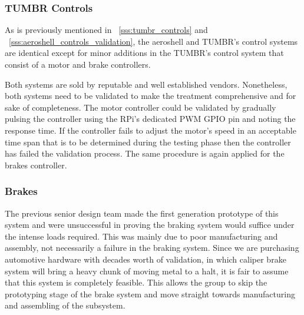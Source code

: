 \subsubsection{TUMBR Controls}

\indent\indent  As is previously mentioned in ~\ref{sss:tumbr_controls} and ~\ref{sss:aeroshell_controls_validation}, the aeroshell and TUMBR's control systems are identical except for minor additions in the TUMBR's control system that consist of a motor and brake controllers.

Both systems are sold by reputable and well established vendors. Nonetheless, both systems need to be validated to make the treatment comprehensive and for sake of completeness. The motor controller could be validated by gradually pulsing the controller using the RPi's dedicated PWM GPIO pin and noting the response time. If the controller fails to adjust the motor's speed in an acceptable time span that is to be determined during the testing phase then the controller has failed the validation process. The same procedure is again applied for the brakes controller.


\subsubsection{Brakes}

\indent\indent The previous senior design team made the first generation prototype of this system and were unsuccessful in proving the braking system would suffice under the intense loads required. This was mainly due to poor manufacturing and assembly, not necessarily a failure in the braking system. Since we are purchasing automotive hardware with decades worth of validation, in which caliper brake system will bring a heavy chunk of moving metal to a halt, it is fair to assume that this system is completely feasible. This allows the group to skip the prototyping stage of the brake system and move straight towards manufacturing and assembling of the subsystem.

